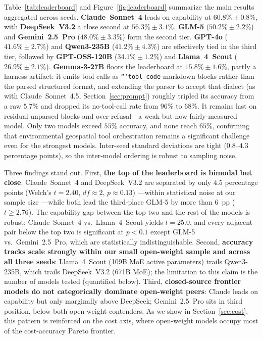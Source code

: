 \documentclass[sigconf]{acmart}
\begin{document}
Table~\ref{tab:leaderboard} and Figure~\ref{fig:leaderboard} summarize the main results aggregated across seeds. \textbf{Claude~Sonnet~4} leads on capability at $60.8\%\pm0.8\%$, with \textbf{DeepSeek~V3.2} a close second at $56.3\%\pm3.1\%$. \textbf{GLM-5} ($50.2\%\pm2.2\%$) and \textbf{Gemini~2.5~Pro} ($48.0\%\pm3.3\%$) form the second tier. \textbf{GPT-4o} ($41.6\%\pm2.7\%$) and \textbf{Qwen3-235B} ($41.2\%\pm4.3\%$) are effectively tied in the third tier, followed by \textbf{GPT-OSS-120B} ($34.1\%\pm1.2\%$) and \textbf{Llama~4~Scout} ($26.9\%\pm2.1\%$). \textbf{Gemma-3-27B} floors the leaderboard at $15.8\%\pm1.6\%$, partly a harness artifact: it emits tool calls as \texttt{```tool\_code} markdown blocks rather than the parsed structured format, and extending the parser to accept that dialect (as with Claude~Sonnet~4.5, Section~\ref{sec:prompt}) roughly tripled its accuracy from a raw $5.7\%$ and dropped its no-tool-call rate from $96\%$ to $68\%$. It remains last on residual unparsed blocks and over-refusal---a weak but now fairly-measured model. Only two models exceed $55\%$ accuracy, and none reach $65\%$, confirming that environmental geospatial tool orchestration remains a significant challenge even for the strongest models. Inter-seed standard deviations are tight ($0.8$--$4.3$ percentage points), so the inter-model ordering is robust to sampling noise.

Three findings stand out. First, \textbf{the top of the leaderboard is bimodal but close}: Claude~Sonnet~4 and DeepSeek~V3.2 are separated by only $4.5$ percentage points (Welch's $t=2.40$, $df\!\approx\!2$, $p\!\approx\!0.13$) ---within statistical noise at our sample size ---while both lead the third-place GLM-5 by more than $6$~pp ($t\!\geq\!2.76$). The capability gap between the top two and the rest of the models is robust: Claude~Sonnet~4 vs.\ Llama~4~Scout yields $t=25.0$, and every adjacent pair below the top two is significant at $p<0.1$ except GLM-5 vs.\ Gemini~2.5~Pro, which are statistically indistinguishable. Second, \textbf{accuracy tracks scale strongly within our small open-weight sample and across all three seeds}: Llama~4~Scout (109B MoE active parameters) trails Qwen3-235B, which trails DeepSeek~V3.2 (671B MoE); the limitation to this claim is the number of models tested (quantified below). Third, \textbf{closed-source frontier models do not categorically dominate open-weight peers}: Claude leads on capability but only marginally above DeepSeek; Gemini~2.5~Pro sits in third position, below both open-weight contenders. As we show in Section~\ref{sec:cost}, this pattern is reinforced on the cost axis, where open-weight models occupy most of the cost-accuracy Pareto frontier.
\end{document}
